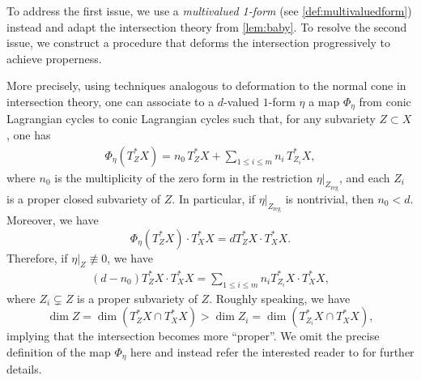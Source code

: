 \documentclass[english]{amsproc}
\theoremstyle{plain}
\theoremstyle{definition}
\theoremstyle{remark}
\theoremstyle{plain}
\numberwithin{equation}{thm} %
\begin{document}
To address the first issue, we use  a \emph{multivalued 1-form} (see \cref{def:multivaluedform}) instead and adapt the intersection theory from \cref{lem:baby}. To resolve the second issue, we construct a procedure that deforms the intersection progressively to achieve properness.

	 

More precisely, using techniques analogous to deformation to the normal cone in intersection theory, one can associate to a $d$-valued $1$-form $\eta$ a map $\Phi_\eta$ from conic Lagrangian cycles to conic Lagrangian cycles such that, for any subvariety $Z \subset X$, one has
\begin{align}\label{eq:vanishing cycle}
	\Phi_\eta(T_Z^*X)
	= n_0\, T_Z^*X + \sum_{1 \le i \le m} n_i\, T_{Z_i}^*X,
\end{align}
where \(n_0\) is the multiplicity of the zero form in the restriction 
\(\eta|_{Z_{\mathrm{reg}}}\), and each \(Z_i\) is a proper closed subvariety of \(Z\).
In particular, if \(\eta|_{Z_{\mathrm{reg}}}\) is nontrivial, then \(n_0 < d\).
	Moreover, we have
	$$
	\Phi_\eta(T_Z^*X)\cdot T_X^*X=d T_Z^*X\cdot T_X^*X.
	$$
	Therefore,
	if $\eta|_Z\not\equiv 0$, we have
	\begin{align}\label{eq:iteration}
		(d-n_0) T_Z^*X\cdot T_X^*X=\sum_{1 \leq i \leq m} n_i T_{Z_i}^* X\cdot T_X^*X,
	\end{align}
 where $Z_i \subsetneq Z$ is a proper subvariety of $Z$. Roughly speaking, we have
	\[
	\dim Z = \dim(T_Z^*X \cap T_X^*X) > \dim Z_i = \dim(T_{Z_i}^*X \cap T_X^*X),
	\]
	implying that the intersection becomes more ``proper''. We omit the precise definition of the map $\Phi_{\eta}$ here and instead refer the interested reader to \cite[\S 3.1]{DW24} for further details. 
	
\end{document}

